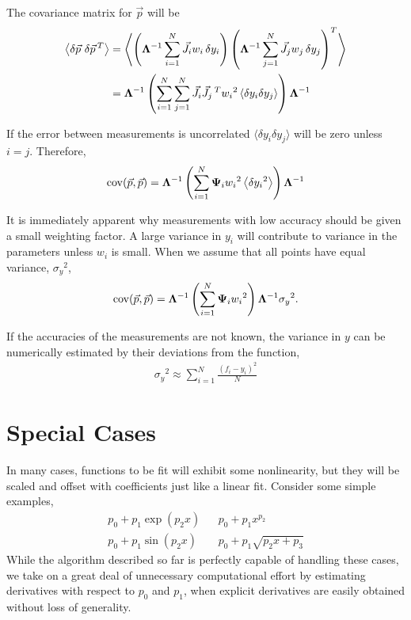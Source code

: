 \documentclass{article}
\def\p{\vec{p}}
\def\J{\vec{J}}
\def\LAM{{\bf \Lambda}}
\def\PSI{{\bf \Psi}}
\begin{document}
The covariance matrix for $\p$ will be
\begin{align}
\left\langle \delta\p\ \delta\p\,{^T} \right\rangle &= \left\langle \left(\LAM^{-1} \sum_{i=1}^N \J_i w_i\, \delta y_i \right) \left(\LAM^{-1} \sum_{j=1}^N \J_j w_j\, \delta y_j\right)^T \right\rangle\nonumber\\
&= \LAM^{-1} \left( \sum_{i=1}^N \sum_{j=1}^N \J_i \J_j\,{^T} w_i{^2} \left\langle \delta y_i \delta y_j \right\rangle \right) \LAM^{-1} \nonumber
\end{align}

If the error between measurements is uncorrelated $\langle \delta y_i \delta y_j \rangle$ will be zero unless $i=j$.  Therefore,
\begin{align}
\mathrm{cov}(\p,\p) = \LAM^{-1} \left( \sum_{i=1}^N \PSI_i w_i{^2} \left\langle \delta y_i{^2} \right\rangle \right) \LAM^{-1}\label{eqn:covar}
\end{align}

It is immediately apparent why measurements with low accuracy should be given a small weighting factor.  A large variance in $y_i$ will contribute to variance in the parameters unless $w_i$ is small.  When we assume that all points have equal variance, $\sigma_y{^2}$,
\begin{align}
\mathrm{cov}(\p,\p) =  \LAM^{-1} \left( \sum_{i=1}^N \PSI_i w_i{^2} \right) \LAM^{-1} \sigma_y{^2}.\label{eqn:covar2}
\end{align}

If the accuracies of the measurements are not known, the variance in $y$ can be numerically estimated by their deviations from the function,
\begin{align}
\sigma_y{^2} \approx \sum_{i=1}^N \frac{\left( f_i - y_i \right)^2}{N}
\end{align}

\section{Special Cases}
In many cases, functions to be fit will exhibit some nonlinearity, but they will be scaled and offset with coefficients just like a linear fit.  Consider some simple examples,
\begin{align}
p_0 + p_1 \exp\left(p_2 x\right) & & p_0 + p_1 x ^{p_2}\nonumber\\
p_0 + p_1 \sin\left(p_2 x\right) & & p_0 + p_1 \sqrt{p_2 x + p_3}\nonumber
\end{align}
While the algorithm described so far is perfectly capable of handling these cases, we take on a great deal of unnecessary computational effort by estimating derivatives with respect to $p_0$ and $p_1$, when explicit derivatives are easily obtained without loss of generality.
\end{document}
